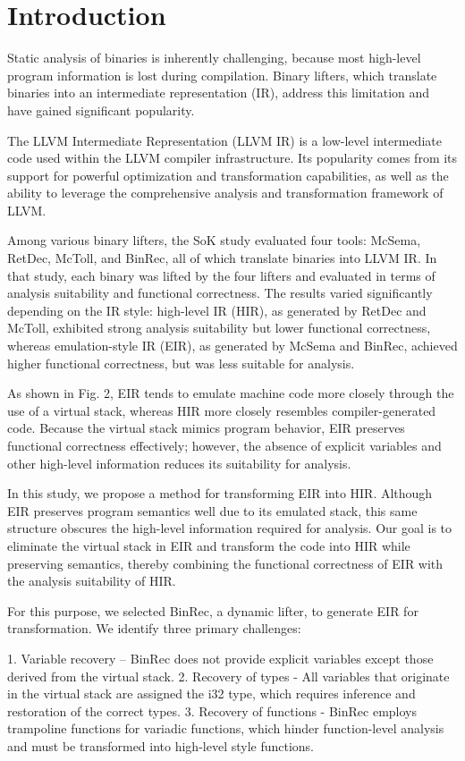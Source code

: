 \section{Introduction}
Static analysis of binaries is inherently challenging, because most high-level
program information is lost during compilation. Binary lifters, which translate
binaries into an intermediate representation (IR), address this limitation and
have gained significant popularity.

The LLVM Intermediate Representation (LLVM IR) is a low-level intermediate code
used within the LLVM compiler infrastructure. Its popularity comes from its
support for powerful optimization and transformation capabilities, as well as
the ability to leverage the comprehensive analysis and transformation framework
of LLVM.

Among various binary lifters, the SoK study evaluated four tools: McSema,
RetDec, McToll, and BinRec, all of which translate binaries into LLVM IR. In
that study, each binary was lifted by the four lifters and evaluated in terms
of analysis suitability and functional correctness. The results varied
significantly depending on the IR style: high-level IR (HIR), as generated by
RetDec and McToll, exhibited strong analysis suitability but lower functional
correctness, whereas emulation-style IR (EIR), as generated by McSema and
BinRec, achieved higher functional correctness, but was less suitable for
analysis.

As shown in Fig. 2, EIR tends to emulate machine code more closely through the
use of a virtual stack, whereas HIR more closely resembles compiler-generated
code. Because the virtual stack mimics program behavior, EIR preserves
functional correctness effectively; however, the absence of explicit variables
and other high-level information reduces its suitability for analysis.

In this study, we propose a method for transforming EIR into HIR. Although EIR
preserves program semantics well due to its emulated stack, this same structure
obscures the high-level information required for analysis. Our goal is to
eliminate the virtual stack in EIR and transform the code into HIR while
preserving semantics, thereby combining the functional correctness of EIR with
the analysis suitability of HIR.

For this purpose, we selected BinRec, a dynamic lifter, to generate EIR for
transformation. We identify three primary challenges:

1. Variable recovery – BinRec does not provide explicit variables except those
derived from the virtual stack. 2. Recovery of types - All variables that
originate in the virtual stack are assigned the i32 type, which requires
inference and restoration of the correct types. 3. Recovery of functions -
BinRec employs trampoline functions for variadic functions, which hinder
function-level analysis and must be transformed into high-level style
functions.

